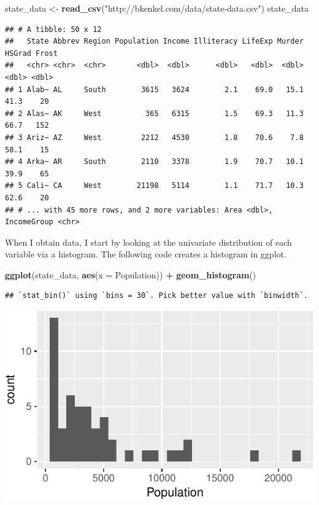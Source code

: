 \documentclass[12pt,oneside,openany]{book}
\newenvironment{Shaded}{\begin{snugshade}}{\end{snugshade}}
\newcommand{\KeywordTok}[1]{\textcolor[rgb]{0.13,0.29,0.53}{\textbf{#1}}}
\newcommand{\DataTypeTok}[1]{\textcolor[rgb]{0.13,0.29,0.53}{#1}}
\newcommand{\StringTok}[1]{\textcolor[rgb]{0.31,0.60,0.02}{#1}}
\newcommand{\OperatorTok}[1]{\textcolor[rgb]{0.81,0.36,0.00}{\textbf{#1}}}
\newcommand{\NormalTok}[1]{#1}
\begin{document}
\begin{Shaded}
\begin{Highlighting}[]
\NormalTok{state_data <-}\StringTok{ }\KeywordTok{read_csv}\NormalTok{(}\StringTok{"http://bkenkel.com/data/state-data.csv"}\NormalTok{)}
\NormalTok{state_data}
\end{Highlighting}
\end{Shaded}

\begin{verbatim}
## # A tibble: 50 x 12
##   State Abbrev Region Population Income Illiteracy LifeExp Murder HSGrad Frost
##   <chr> <chr>  <chr>       <dbl>  <dbl>      <dbl>   <dbl>  <dbl>  <dbl> <dbl>
## 1 Alab~ AL     South        3615   3624        2.1    69.0   15.1   41.3    20
## 2 Alas~ AK     West          365   6315        1.5    69.3   11.3   66.7   152
## 3 Ariz~ AZ     West         2212   4530        1.8    70.6    7.8   58.1    15
## 4 Arka~ AR     South        2110   3378        1.9    70.7   10.1   39.9    65
## 5 Cali~ CA     West        21198   5114        1.1    71.7   10.3   62.6    20
## # ... with 45 more rows, and 2 more variables: Area <dbl>, IncomeGroup <chr>
\end{verbatim}

When I obtain data, I start by looking at the univariate distribution of
each variable via a histogram. The following code creates a histogram in
ggplot.

\begin{Shaded}
\begin{Highlighting}[]
\KeywordTok{ggplot}\NormalTok{(state_data, }\KeywordTok{aes}\NormalTok{(}\DataTypeTok{x =}\NormalTok{ Population)) }\OperatorTok{+}
\StringTok{  }\KeywordTok{geom_histogram}\NormalTok{()}
\end{Highlighting}
\end{Shaded}

\begin{verbatim}
## `stat_bin()` using `bins = 30`. Pick better value with `binwidth`.
\end{verbatim}

\includegraphics{pdaps_files/figure-latex/histogram-1.pdf}
\end{document}
